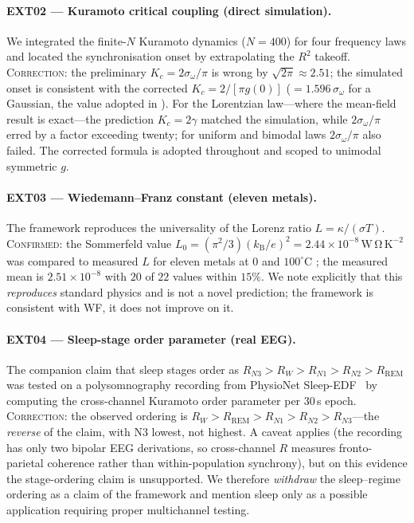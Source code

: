 \documentclass[11pt,twocolumn,a4paper]{article}
\newcommand{\kB}{k_{\mathrm{B}}}
\newcommand{\Kc}{K_c}
\newcommand{\Ord}{R}
\begin{document}
\paragraph{EXT02 --- Kuramoto critical coupling (direct simulation).}
We integrated the finite-$N$ Kuramoto dynamics ($N=400$) for four
frequency laws and located the synchronisation onset by extrapolating the
$\Ord^2$ takeoff. \textsc{Correction}: the preliminary $\Kc=2\sigma_\omega/\pi$
is wrong by $\sqrt{2\pi}\approx2.51$; the simulated onset is consistent with the
corrected $\Kc=2/[\pi g(0)]$ ($=1.596\,\sigma_\omega$ for a Gaussian, the value
adopted in ). For the Lorentzian law---where the mean-field result
is exact---the prediction $\Kc=2\gamma$ matched the simulation, while
$2\sigma_\omega/\pi$ erred by a factor exceeding twenty; for uniform and bimodal
laws $2\sigma_\omega/\pi$ also failed. The corrected formula is adopted
throughout and scoped to unimodal symmetric $g$.

\paragraph{EXT03 --- Wiedemann--Franz constant (eleven metals).}
The framework reproduces the universality of the Lorenz ratio
$L=\kappa/(\sigma T)$. \textsc{Confirmed}: the Sommerfeld value
$L_0=(\pi^2/3)(\kB/e)^2=2.44\times10^{-8}\,\mathrm{W\,\Omega\,K^{-2}}$ was
compared to measured $L$ for eleven metals at $0$ and $100^\circ$C
\cite{kittel2005}; the measured mean is $2.51\times10^{-8}$ with $20$ of $22$
values within $15\%$. We note explicitly that this \emph{reproduces} standard
physics and is not a novel prediction; the framework is consistent with WF, it
does not improve on it.

\paragraph{EXT04 --- Sleep-stage order parameter (real EEG).}
The companion claim that sleep stages order as $\Ord_{N3}>\Ord_W>\Ord_{N1}>
\Ord_{N2}>\Ord_{\mathrm{REM}}$ was tested on a polysomnography recording from
PhysioNet Sleep-EDF~\cite{kemp2000,goldberger2000} by computing the
cross-channel Kuramoto order parameter per $30$\,s epoch.
\textsc{Correction}: the observed ordering is $\Ord_W>\Ord_{\mathrm{REM}}>
\Ord_{N1}>\Ord_{N2}>\Ord_{N3}$---the \emph{reverse} of the claim, with N3
lowest, not highest. A caveat applies (the recording has only two bipolar EEG
derivations, so cross-channel $\Ord$ measures fronto-parietal coherence rather
than within-population synchrony), but on this evidence the stage-ordering claim
is unsupported. We therefore \emph{withdraw} the sleep--regime ordering as a
claim of the framework and mention sleep only as a possible application
requiring proper multichannel testing.
\end{document}
